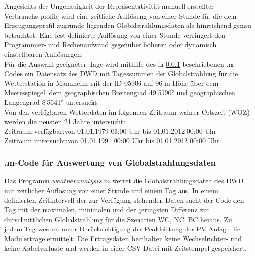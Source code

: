 			
			Angesichts der Ungenauigkeit der Repräsentativität manuell erstellter Verbrauchs-profile wird eine zeitliche Auflösung von einer Stunde für die dem Erzeugungsprofil zugrunde liegenden Globalstrahlungsdaten als hinreichend genau betrachtet. Eine fest definierte Auflösung von einer Stunde verringert den Programmier- und Rechenaufwand gegenüber höheren oder dynamisch einstellbaren Auflösungen.  \\
						
					
			Für die Auswahl geeigneter Tage wird mithilfe des in \ref{Kap:Sim_cfg_gen_code} beschriebenen .m-Codes ein Datensatz des DWD mit Tagessummen der Globalstrahlung für die Wetterstation in Mannheim mit der ID 05906 auf 96 m Höhe über dem Meeresspiegel, dem geographischen Breitengrad 49.5090° und geographischen Längengrad 8.5541° untersucht. \\

			Von den verfügbaren Wetterdaten im folgenden Zeitraum wahrer Ortszeit (WOZ) werden die neusten 21 Jahre untersucht: \\
			Zeitraum verfügbar:\quad 	von 01.01.1979 00:00 Uhr \quad bis 01.01.2012 00:00 Uhr \\
			Zeitraum untersucht:\quad 	von 01.01.1991 00:00 Uhr \quad bis 01.01.2012 00:00 Uhr \\

            
			\subsubsection{.m-Code für Auswertung von Globalstrahlungsdaten}
			\label{Kap:Sim_cfg_gen_code}
            	Das Programm $weatheranalysis.m$ wertet die Globalstrahlungsdaten des DWD mit zeitlicher Auflösung von einer Stunde und einem Tag aus. In einem definierten Zeitintervall der zur Verfügung stehenden Daten sucht der Code den Tag mit der maximalen, minimalen und der geringsten Differenz zur durschnittlichen Globalstrahlung für die Szenarien \ac{WC}, \ac{NC}, \ac{BC} heraus. Zu jedem Tag werden unter Berücksichtigung der Peakleistung der PV-Anlage die Modulerträge ermittelt. Die Ertragsdaten beinhalten keine Wechselrichter- und keine Kabelverluste und werden in einer CSV-Datei mit Zeitstempel gespeichert. \\


